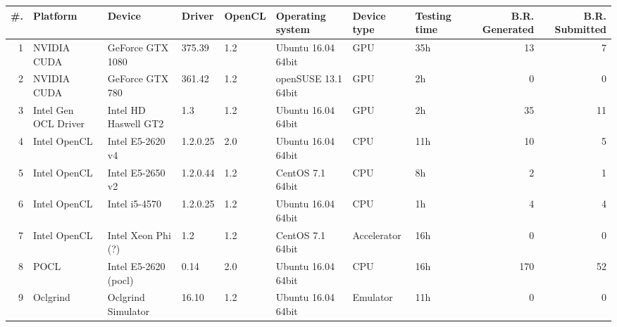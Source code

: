 \begin{tabular}{rlllllllrr}
\toprule
 \#. &              Platform &                Device &    Driver & OpenCL &      Operating system &  Device type & Testing time &  B.R. Generated &  B.R. Submitted \\
\midrule
  1 &           NVIDIA CUDA &      GeForce GTX 1080 &    375.39 &    1.2 &    Ubuntu 16.04 64bit &          GPU &          35h &              13 &               7 \\
  2 &           NVIDIA CUDA &       GeForce GTX 780 &    361.42 &    1.2 &  openSUSE  13.1 64bit &          GPU &           2h &               0 &               0 \\
  3 &  Intel Gen OCL Driver &  Intel HD Haswell GT2 &       1.3 &    1.2 &    Ubuntu 16.04 64bit &          GPU &           2h &              35 &              11 \\
  4 &          Intel OpenCL &      Intel E5-2620 v4 &  1.2.0.25 &    2.0 &    Ubuntu 16.04 64bit &          CPU &          11h &              10 &               5 \\
  5 &          Intel OpenCL &      Intel E5-2650 v2 &  1.2.0.44 &    1.2 &      CentOS 7.1 64bit &          CPU &           8h &               2 &               1 \\
  6 &          Intel OpenCL &         Intel i5-4570 &  1.2.0.25 &    1.2 &    Ubuntu 16.04 64bit &          CPU &           1h &               4 &               4 \\
  7 &          Intel OpenCL &    Intel Xeon Phi (?) &       1.2 &    1.2 &      CentOS 7.1 64bit &  Accelerator &          16h &               0 &               0 \\
  8 &                  POCL &  Intel E5-2620 (pocl) &      0.14 &    2.0 &    Ubuntu 16.04 64bit &          CPU &          16h &             170 &              52 \\
  9 &              Oclgrind &    Oclgrind Simulator &     16.10 &    1.2 &    Ubuntu 16.04 64bit &     Emulator &          11h &               0 &               0 \\
\bottomrule
\end{tabular}
